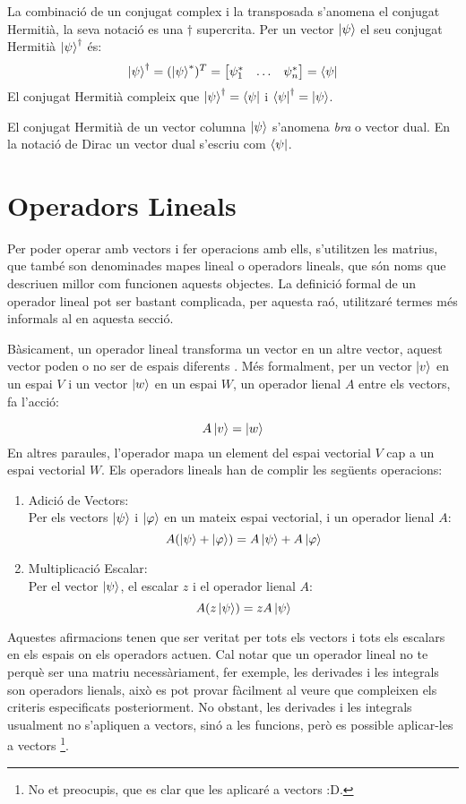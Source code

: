 La combinació de un conjugat complex i la transposada s'anomena el conjugat Hermitià, la seva notació es una $\dagger$ supercrita. Per un vector $\ket{\psi}$ el seu conjugat Hermitià $\ket{\psi}^\dagger$ és:
$$
\ket{\psi}^\dagger = (\ket{\psi}^*)^T =  \begin{bmatrix} \psi_{1}^* & \dots & \psi_{n}^* \end{bmatrix} = \bra{\psi}
$$
El conjugat Hermitià compleix que $\ket{\psi}^\dagger = \bra{\psi}$ i $\bra{\psi}^\dagger = \ket{\psi}$.

El conjugat Hermitià de un vector columna $\ket{\psi}$ s'anomena \textit{bra} o vector dual. En la notació de Dirac un vector dual s'escriu com $\bra{\psi}$.

\section{Operadors Lineals}
Per poder operar amb vectors i fer operacions amb ells, s'utilitzen les matrius, que també son denominades mapes lineal o operadors lineals, que són noms que descriuen millor com funcionen aquests objectes. La definició formal de un operador lineal pot ser bastant complicada, per aquesta raó, utilitzaré termes més informals al en aquesta secció. 

Bàsicament, un operador lineal transforma un vector en un altre vector, aquest vector poden o no ser de espais diferents \cite{LR_done_right:linear_map}. Més formalment, per un vector $\ket{v}$ en un espai $V$ i un vector $\ket{w}$ en un espai $W$, un operador lienal $A$ entre els vectors, fa l'acció:

$$
A \ket{v} = \ket{w}
$$
En altres paraules, l'operador mapa un element del espai vectorial $V$ cap a un espai vectorial $W$.
Els operadors lineals han de complir les següents operacions:
\begin{enumerate}
	\item Adició de Vectors: \\
	Per els vectors $\ket{\psi}$ i $\ket{\varphi}$ en un mateix espai vectorial, i un operador lienal $A$:
	$$ A(\ket{\psi} + \ket{\varphi}) = A\ket{\psi} + A\ket{\varphi}$$ 
	\item Multiplicació Escalar:\\
	Per el vector $\ket{\psi}$, el escalar $z$ i el operador lienal $A$:
	$$ A(z\ket{\psi}) = z A \ket{\psi}$$
\end{enumerate}

Aquestes afirmacions tenen que ser veritat per tots els vectors i tots els escalars en els espais on els operadors actuen. Cal notar que un operador lineal no te perquè ser una matriu necessàriament, fer exemple, les derivades i les integrals son operadors lienals, això es pot provar fàcilment al veure que compleixen els criteris especificats posteriorment. No obstant, les derivades i les integrals usualment no s'apliquen a vectors, sinó a les funcions, però es possible aplicar-les a vectors \footnote{No et preocupis, que es clar que les aplicaré a vectors :D.}.

